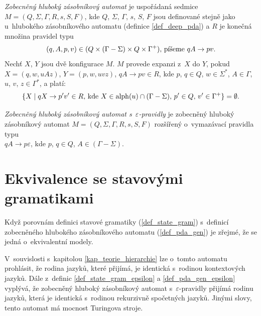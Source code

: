 \begin{Def} \label{def_pda_gen}
\emph{Zobecněný hluboký zásobníkový automat} je uspořádaná sedmice \\$M = (Q,\Sigma,\Gamma, R, s, S, F)$, 
kde $Q$, $\Sigma$, $\Gamma$, $s$, $S$, $F$ jsou definované stejně jako u~hlubokého zásobníkového automatu (definice \ref{def_deep_pda}) a $R$ je konečná množina pravidel typu 
\begin{equation*} 
(q, A, p, v) \in (Q \times (\Gamma-\Sigma) \times Q \times {\Gamma}^+)\textnormal{, píšeme }qA \rightarrow pv. 
\end{equation*}
Nechť $X$, $Y$ jsou dvě konfigurace $M$.  $M$ provede expanzi z~$X$ do $Y$, pokud $X = (q, w, uAz)$, $Y = (p, w, uvz)$, $qA \rightarrow pv \in R$, kde $p$, $q \in Q$, $w \in \Sigma^*$, $A \in \Gamma$, $u$, $v$, $z \in \Gamma^*$, a platí:
\begin{equation*} 
\{X \mid qX \rightarrow p'v' \in R\textnormal{, kde }X \in \mathrm{alph}(u) \cap (\Gamma - \Sigma)\textnormal{, }p' \in Q\textnormal{, }v' \in {\Gamma}^+ \} = \emptyset. 
\end{equation*}
\end{Def}

\begin{Def}\label{def_pda_gen_epsilon}
\emph{Zobecněný hluboký zásobníkový automat s~$\varepsilon$-pravidly} je zobecněný hluboký zásobníkový automat $M = (Q,\Sigma,\Gamma, R, s, S, F)$ rozšířený o~vymazávací pravidla typu\\ $qA \rightarrow p\varepsilon$, kde $p$, $q \in Q$, $A \in (\Gamma - \Sigma)$.
\end{Def}


 \section{Ekvivalence se stavovými gramatikami} \label{sec_ekv_state_grammars}

Když porovnám definici stavové gramatiky (\ref{def_state_gram}) s~definicí zobecněného hlubokého zásobníkového automatu (\ref{def_pda_gen}) je zřejmé, že se jedná o~ekvivalentní modely.

V~souvislosti s~kapitolou \ref{kap_teorie_hierarchie} lze o~tomto automatu prohlásit, že rodina jazyků, které přijímá, je identická s~rodinou kontextových jazyků. Dále z~definic \ref{def_state_gram_epsilon} a \ref{def_pda_gen_epsilon} vyplývá, že zobecněný hluboký zásobníkový automat s~$\varepsilon$-pravidly přijímá rodinu jazyků, která je identická s~rodinou  rekurzivně spočetných jazyků. Jinými slovy, tento automat má mocnost Turingova stroje.

